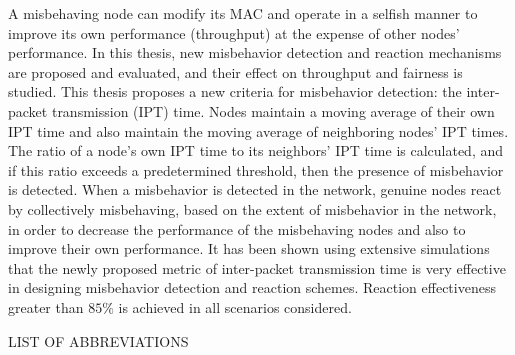 \documentclass[12pt,letterpaper,english]{article}
\begin{document}
A misbehaving node can modify its MAC and operate in a selfish manner to improve its own performance (throughput) at the expense of other nodes' performance. 
In this thesis, new misbehavior detection and reaction mechanisms are proposed and evaluated, and their effect on throughput and fairness is studied. 
This thesis proposes a new criteria for misbehavior detection: the inter-packet transmission (IPT) time.
Nodes maintain a moving average of their own IPT time and also maintain the moving average of neighboring nodes' IPT times. 
The ratio of a node's own IPT time to its neighbors' IPT time is calculated, and if this ratio exceeds a predetermined threshold, then the presence of misbehavior is detected. 
When a misbehavior is detected in the network, genuine nodes react by collectively misbehaving, based on the extent of misbehavior in the network, in order to decrease the performance of the misbehaving nodes and also to improve their own performance. 
It has been shown using extensive simulations that the newly proposed metric of inter-packet transmission time is very effective in designing misbehavior detection and reaction schemes. Reaction effectiveness greater than $85\%$ is achieved in all scenarios considered.
\newpage
\singlespacing
\tableofcontents
\newpage
\listoftables
\newpage
\listoffigures
\newpage
\begin{center}LIST OF ABBREVIATIONS\end{center}
\end{document}
